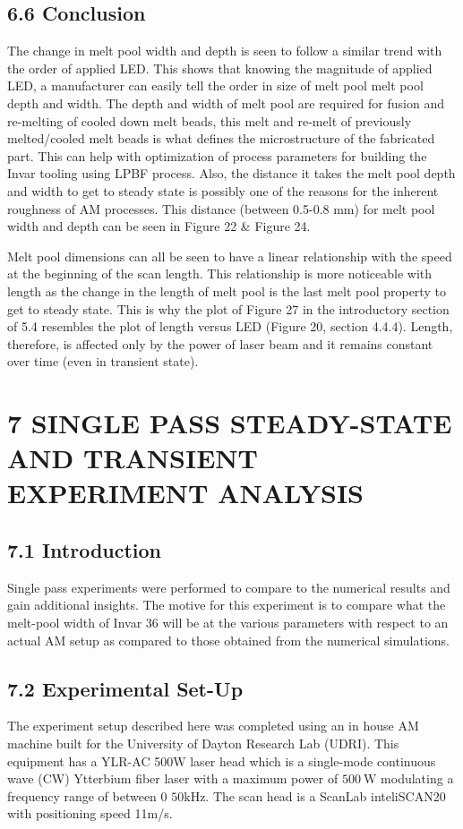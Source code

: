\documentclass[10pt]{article}
\begin{document}
\subsection*{6.6 Conclusion}
The change in melt pool width and depth is seen to follow a similar trend with the order of applied LED. This shows that knowing the magnitude of applied LED, a manufacturer can easily tell the order in size of melt pool melt pool depth and width. The depth and width of melt pool are required for fusion and re-melting of cooled down melt beads, this melt and re-melt of previously melted/cooled melt beads is what defines the microstructure of the fabricated part. This can help with optimization of process parameters for building the Invar tooling using LPBF process. Also, the distance it takes the melt pool depth and width to get to steady state is possibly one of the reasons for the inherent roughness of AM processes. This distance (between 0.5-0.8 mm) for melt pool width and depth can be seen in Figure 22 \& Figure 24.

Melt pool dimensions can all be seen to have a linear relationship with the speed at the beginning of the scan length. This relationship is more noticeable with length as the change in the length of melt pool is the last melt pool property to get to steady state. This is why the plot of Figure 27 in the introductory section of 5.4 resembles the plot of length versus LED (Figure 20, section 4.4.4). Length, therefore, is affected only by the power of laser beam and it remains constant over time (even in transient state).

\section*{7 SINGLE PASS STEADY-STATE AND TRANSIENT EXPERIMENT ANALYSIS}
\subsection*{7.1 Introduction}
Single pass experiments were performed to compare to the numerical results and gain additional insights. The motive for this experiment is to compare what the melt-pool width of Invar 36 will be at the various parameters with respect to an actual AM setup as compared to those obtained from the numerical simulations.

\subsection*{7.2 Experimental Set-Up}
The experiment setup described here was completed using an in house AM machine built for the University of Dayton Research Lab (UDRI). This equipment has a YLR-AC 500W laser head which is a single-mode continuous wave (CW) Ytterbium fiber laser with a maximum power of $500 \mathrm{~W}$ modulating a frequency range of between 0 $50 \mathrm{kHz}$. The scan head is a ScanLab inteliSCAN20 with positioning speed 11m/s.
\end{document}
